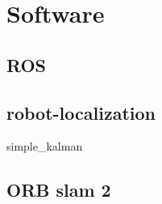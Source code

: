 \documentclass[class=article, crop=false]{standalone}
\begin{document}
\section{Software}\label{sec:software}

\subsection{ROS}\label{subsec:ros}

\subsection{robot-localization}\label{subsec:robot-localization}

{simple_kalman}

\subsection{ORB slam 2}\label{subsec:orbslam2}
\end{document}
